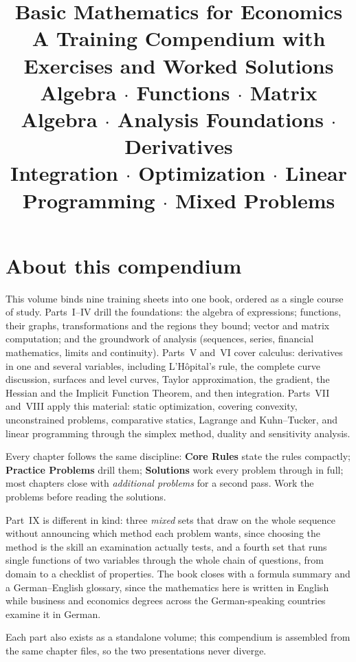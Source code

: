 \documentclass[10pt,oneside]{book}
\title{\Huge Basic Mathematics for Economics\\[0.4em]
  \LARGE A Training Compendium with Exercises and Worked Solutions\\[0.8em]
  \large Algebra \(\cdot\) Functions \(\cdot\) Matrix Algebra
  \(\cdot\) Analysis Foundations \(\cdot\) Derivatives\\[0.2em]
  \large Integration \(\cdot\) Optimization \(\cdot\) Linear Programming
  \(\cdot\) Mixed Problems}
\author{}
\date{}
\begin{document}
\frontmatter
\maketitle

\chapter*{About this compendium}

This volume binds nine training sheets into one book, ordered as a single
course of study. Parts~I--IV drill the foundations: the algebra of
expressions; functions, their graphs, transformations and the regions they
bound; vector and matrix computation; and the groundwork of analysis
(sequences, series, financial mathematics, limits and continuity).
Parts~V and~VI cover calculus: derivatives in one and several variables,
including L'H\^opital's rule, the complete curve discussion, surfaces and
level curves, Taylor approximation, the gradient, the Hessian and the
Implicit Function Theorem, and then integration. Parts~VII and~VIII apply
this material: static optimization, covering convexity, unconstrained problems,
comparative statics, Lagrange and Kuhn--Tucker, and linear programming
through the simplex method, duality and sensitivity analysis.

Every chapter follows the same discipline: \textbf{Core Rules} state the
rules compactly; \textbf{Practice Problems} drill them; \textbf{Solutions}
work every problem through in full; most chapters close with
\emph{additional problems} for a second pass. Work the problems before
reading the solutions.

Part~IX is different in kind: three \emph{mixed} sets that draw on the
whole sequence without announcing which method each problem wants, since
choosing the method is the skill an examination actually tests, and a
fourth set that runs single functions of two variables through the whole
chain of questions, from domain to a checklist of properties. The book
closes with a formula summary and a German--English glossary, since the
mathematics here is written in English while business and economics degrees
across the German-speaking countries examine it in German.

Each part also exists as a standalone volume; this compendium is assembled
from the same chapter files, so the two presentations never diverge.

\tableofcontents
\end{document}
